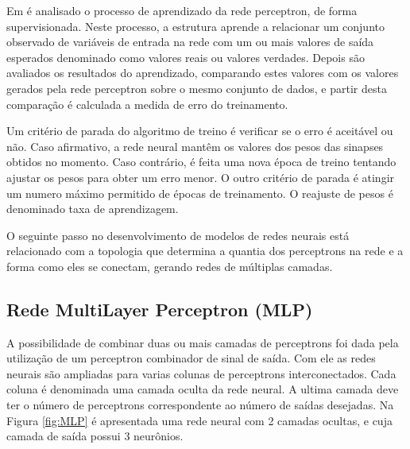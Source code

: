             Em  é analisado o processo de aprendizado da rede perceptron, de forma supervisionada. Neste processo, a estrutura aprende a relacionar um conjunto observado de variáveis de entrada na rede com um ou mais valores de saída esperados denominado como valores reais ou valores verdades. Depois são avaliados os resultados do aprendizado, comparando estes valores com os valores gerados pela rede perceptron sobre o mesmo conjunto de dados, e partir desta comparação é calculada a medida de erro do treinamento.
                        
            Um critério de parada do algoritmo de treino é verificar se o erro é aceitável ou não. Caso afirmativo, a rede neural mantêm os valores dos pesos das sinapses obtidos no momento. Caso contrário, é feita uma nova época de treino tentando ajustar os pesos para obter um erro menor.
            O outro critério de parada é atingir um numero máximo permitido de épocas de treinamento. O reajuste de pesos é denominado taxa de aprendizagem.
            
            O seguinte passo no desenvolvimento de modelos de redes neurais está relacionado com a topologia que determina a quantia dos perceptrons na rede e a forma como eles se conectam, gerando redes de múltiplas camadas.        
    
        \subsection{Rede MultiLayer Perceptron (MLP)}
    
            A possibilidade de combinar duas ou mais camadas de perceptrons foi dada pela utilização de um perceptron combinador de sinal de saída. Com ele as redes neurais são ampliadas para varias colunas de perceptrons interconectados. Cada coluna é denominada uma camada oculta da rede neural. A ultima camada deve ter o número de perceptrons correspondente ao número de saídas desejadas. Na Figura \ref{fig:MLP} é apresentada  uma rede neural com 2 camadas ocultas, e cuja camada de saída possui 3 neurônios.
            
            \begin{figure}[ht]
            \end{figure}
            
